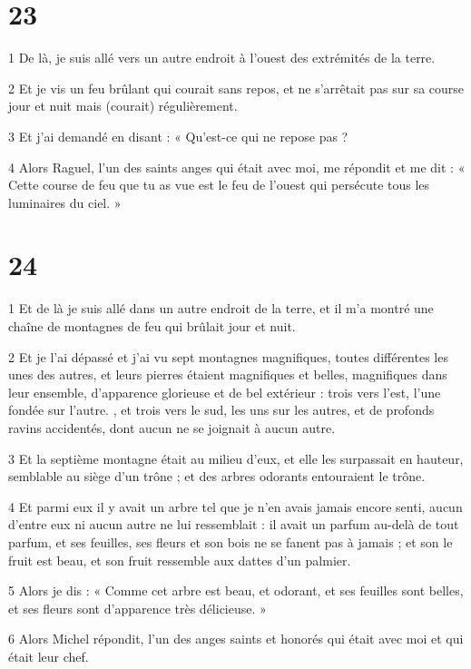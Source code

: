 \chapter{23}

\par 1 De là, je suis allé vers un autre endroit à l'ouest des extrémités de la terre.
\par 2 Et je vis un feu brûlant qui courait sans repos, et ne s'arrêtait pas sur sa course jour et nuit mais (courait) régulièrement.
\par 3 Et j'ai demandé en disant : « Qu'est-ce qui ne repose pas ?
\par 4 Alors Raguel, l'un des saints anges qui était avec moi, me répondit et me dit : « Cette course de feu que tu as vue est le feu de l'ouest qui persécute tous les luminaires du ciel. »

\chapter{24}

\par 1 Et de là je suis allé dans un autre endroit de la terre, et il m'a montré une chaîne de montagnes de feu qui brûlait jour et nuit.
\par 2 Et je l'ai dépassé et j'ai vu sept montagnes magnifiques, toutes différentes les unes des autres, et leurs pierres étaient magnifiques et belles, magnifiques dans leur ensemble, d'apparence glorieuse et de bel extérieur : trois vers l'est, l'une fondée sur l'autre. , et trois vers le sud, les uns sur les autres, et de profonds ravins accidentés, dont aucun ne se joignait à aucun autre.
\par 3 Et la septième montagne était au milieu d'eux, et elle les surpassait en hauteur, semblable au siège d'un trône ; et des arbres odorants entouraient le trône.
\par 4 Et parmi eux il y avait un arbre tel que je n'en avais jamais encore senti, aucun d'entre eux ni aucun autre ne lui ressemblait : il avait un parfum au-delà de tout parfum, et ses feuilles, ses fleurs et son bois ne se fanent pas à jamais ; et son le fruit est beau, et son fruit ressemble aux dattes d'un palmier.
\par 5 Alors je dis : « Comme cet arbre est beau, et odorant, et ses feuilles sont belles, et ses fleurs sont d'apparence très délicieuse. »
\par 6 Alors Michel répondit, l'un des anges saints et honorés qui était avec moi et qui était leur chef.

